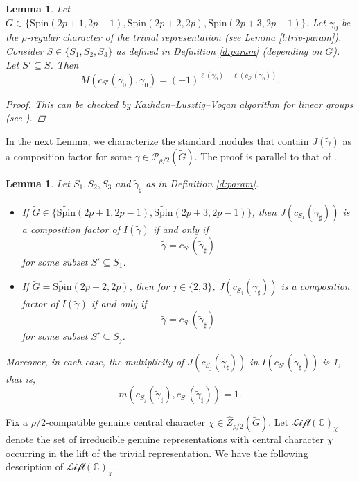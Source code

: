 \documentclass{amsart}
\newcommand{\LLift}{\mathscr{Lift}}
\newcommand{\bbC}{{\mathbb{C}}}
\newcommand{\Spin}{{\mathrm{Spin}}}
\newtheorem{lemma}[thm]{Lemma}
\theoremstyle{definition}
\newcommand{\tu}{\widetilde}
\begin{document}
 


\begin{lemma} \label{l:triv-M}
Let $G\in \{\Spin(2p+1,2p-1), \Spin(2p+2,2p), \Spin(2p+3, 2p-1)\}$. Let $\gamma_0$ be the $\rho$-regular character of the trivial representation (see Lemma \ref{l:triv-param}). 
Consider $S\in \{ S_1, S_2, S_3\}$ as defined in Definition \ref{d:param} (depending on $G$). Let $S'\subseteq S$. Then 
$$
M(c_{S'}(\gamma_0) , \gamma_0)= (-1)^{\ell(\gamma_0) - \ell(c_{S'}(\gamma_0))}.
$$
\begin{proof}
    This can be checked by Kazhdan--Lusztig--Vogan algorithm for linear groups 
   (see \cite[Proposition 6.14]{V83a}).  
\end{proof}


\end{lemma}

In the next Lemma, we characterize the standard modules that contain $J(\tu\gamma)$ as a composition factor for some $\gamma \in \mathcal P_{\rho/2}(\tu G)$. 
The proof is parallel to that of \cite[Lemma 7.2]{Ts23}. 





\begin{lemma}\label{l:comp-factor}
Let  $S_1, S_2, S_3$ and $\tu\gamma_\sharp$ as  in Definition  \ref{d:param}. 
\begin{itemize}
    \item[(1)] If $\tu G\in\{\tu\Spin(2p+1, 2p-1), \tu\Spin(2p+3, 2p-1)\}$, then $J(c_{S_1}(\tu \gamma_\sharp))$ is a composition factor of $I(\tu \gamma)$ if and only if 
    $$
\tu\gamma = c_{S'}(\tu\gamma_\sharp) 
    $$
  for some subset  $S'\subseteq S_1$. 
  \item[(2)] If $\tu G=\tu\Spin(2p+2, 2p)$, then for $j\in\{2, 3\}$, $J(c_{S_j}(\tu \gamma_\sharp))$ is a composition factor of $I(\tu \gamma)$ if and only if 
    $$
\tu\gamma = c_{S'}(\tu\gamma_\sharp) 
    $$
   for some subset $S'\subseteq S_j$. 
\end{itemize}
Moreover, in each case, the multiplicity of $J(c_{S_j}(\tu\gamma_\sharp) )$ in $I(c_{S'}(\tu\gamma_\sharp))$ is 1, that is,
$$
m(c_{S_j} (\tu\gamma_\sharp) , c_{S'}(\tu\gamma_\sharp)) =1. 
$$


\end{lemma}
Fix a $\rho/2$-compatible genuine central character
$\chi\in \widehat Z_{\rho/2}(\tu G).$ Let $\LLift(\bbC)_\chi$ denote the set of irreducible genuine representations
with central character $\chi$ occurring in the lift of the trivial representation.
We have the following description of $\LLift(\bbC)_\chi$.
\end{document}
